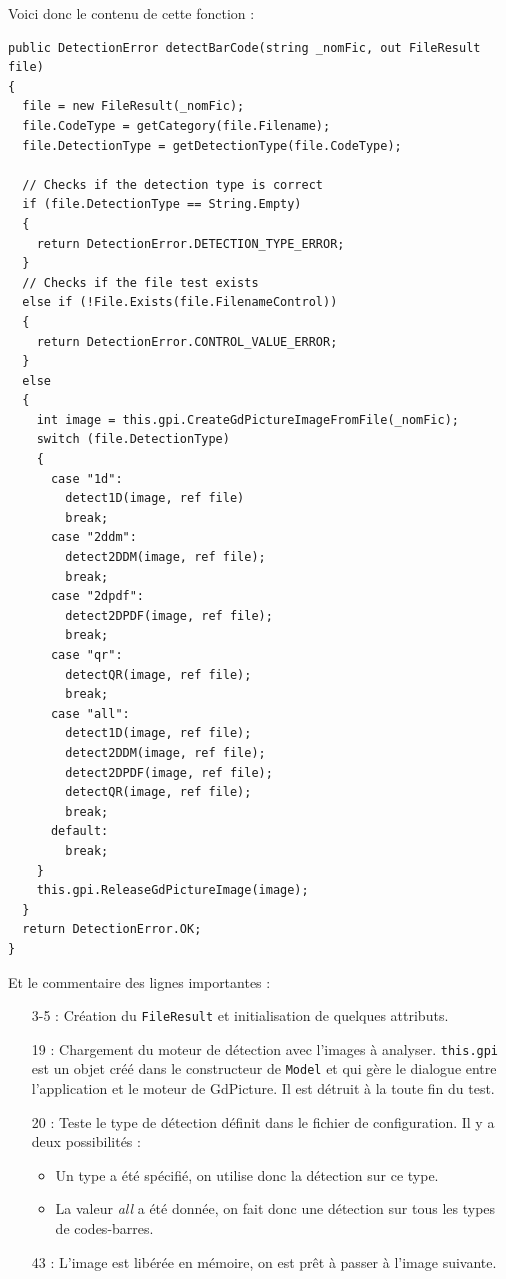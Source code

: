 Voici donc le contenu de cette fonction :
\newpage
\begin{lstlisting}
public DetectionError detectBarCode(string _nomFic, out FileResult file)
{
  file = new FileResult(_nomFic);
  file.CodeType = getCategory(file.Filename);
  file.DetectionType = getDetectionType(file.CodeType);

  // Checks if the detection type is correct
  if (file.DetectionType == String.Empty)
  {
    return DetectionError.DETECTION_TYPE_ERROR;
  }
  // Checks if the file test exists
  else if (!File.Exists(file.FilenameControl))
  {
    return DetectionError.CONTROL_VALUE_ERROR;
  }
  else
  {
    int image = this.gpi.CreateGdPictureImageFromFile(_nomFic);
    switch (file.DetectionType)
    {
      case "1d":
        detect1D(image, ref file)
        break;
      case "2ddm":
        detect2DDM(image, ref file);
        break;
      case "2dpdf":
        detect2DPDF(image, ref file);
        break;
      case "qr":
        detectQR(image, ref file);
        break;
      case "all":
        detect1D(image, ref file);
        detect2DDM(image, ref file);
        detect2DPDF(image, ref file);
        detectQR(image, ref file);
        break;
      default:
        break;
    }
    this.gpi.ReleaseGdPictureImage(image);
  }
  return DetectionError.OK;
}
\end{lstlisting}
\newpage

Et le commentaire des lignes importantes :
\begin{itemize}
\item[3-5 :] Création du \verb|FileResult| et initialisation de quelques attributs.
\item[19 :] Chargement du moteur de détection avec l'images à analyser. \verb|this.gpi| est un objet créé dans le constructeur de \verb|Model| et qui gère le dialogue entre l'application et le moteur de GdPicture. Il est détruit à la toute fin du test.
\item[20 :] Teste le type de détection définit dans le fichier de configuration. Il y a deux possibilités :
	\begin{itemize}
	\item Un type a été spécifié, on utilise donc la détection sur ce type.
	\item La valeur \emph{all} a été donnée, on fait donc une détection sur tous les types de codes-barres.
	\end{itemize}
\item[43 :] L'image est libérée en mémoire, on est prêt à passer à l'image suivante.
\end{itemize}

